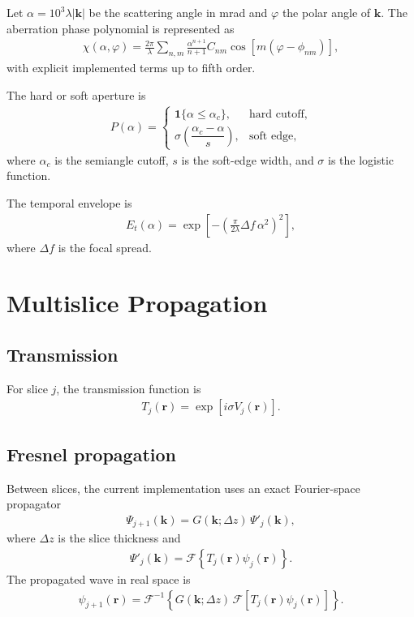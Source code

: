 \documentclass[11pt]{article}
\begin{document}
Let $\alpha = 10^3 \lambda |\mathbf{k}|$ be the scattering angle in mrad and $\varphi$
the polar angle of $\mathbf{k}$.  The aberration phase polynomial is represented as
\begin{align}
  \chi(\alpha,\varphi)
  = \frac{2\pi}{\lambda}\sum_{n,m} \frac{\alpha^{n+1}}{n+1}
  C_{nm}\cos\!\left[m(\varphi-\phi_{nm})\right],
\end{align}
with explicit implemented terms up to fifth order.

The hard or soft aperture is
\begin{align}
  P(\alpha) =
  \begin{cases}
    \mathbf{1}\{\alpha \le \alpha_c\}, & \text{hard cutoff,} \\
    \sigma\!\left(\dfrac{\alpha_c-\alpha}{s}\right), & \text{soft edge,}
  \end{cases}
\end{align}
where $\alpha_c$ is the semiangle cutoff, $s$ is the soft-edge width, and $\sigma$ is
the logistic function.

The temporal envelope is
\begin{align}
  E_t(\alpha)
  = \exp\!\left[
    -\left(
      \frac{\pi}{2\lambda}\Delta f \, \alpha^2
    \right)^2
  \right],
\end{align}
where $\Delta f$ is the focal spread.

\section{Multislice Propagation}
\subsection{Transmission}
For slice $j$, the transmission function is
\begin{align}
  T_j(\mathbf{r}) = \exp\!\left[i \sigma V_j(\mathbf{r})\right].
\end{align}

\subsection{Fresnel propagation}
Between slices, the current implementation uses an exact Fourier-space propagator
\begin{align}
  \Psi_{j+1}(\mathbf{k})
  = G(\mathbf{k}; \Delta z)\,\Psi'_j(\mathbf{k}),
\end{align}
where $\Delta z$ is the slice thickness and
\begin{align}
  \Psi'_j(\mathbf{k}) = \mathcal{F}\left\{ T_j(\mathbf{r})\psi_j(\mathbf{r}) \right\}.
\end{align}
The propagated wave in real space is
\begin{align}
  \psi_{j+1}(\mathbf{r})
  = \mathcal{F}^{-1}\left\{
    G(\mathbf{k}; \Delta z)\,
    \mathcal{F}\left[T_j(\mathbf{r})\psi_j(\mathbf{r})\right]
  \right\}.
\end{align}
\end{document}
